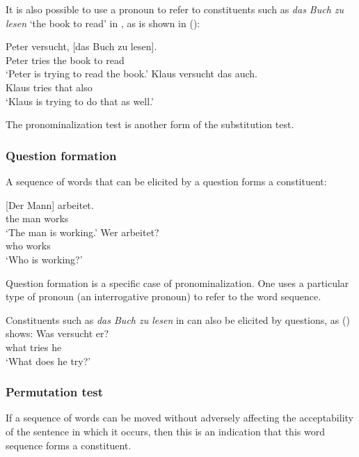 {\noindent
It is also possible to use a pronoun to refer to constituents such as \emph{das Buch zu lesen} `the
book to read' in , as is shown in ():

\eal
\ex 
\gll Peter versucht, [das Buch zu lesen].\\
	 Peter tries \spacebr{}the book to read\\
\glt `Peter is trying to read the book.'
\ex 
\gll Klaus versucht das auch.\\
	 Klaus tries that also\\
\glt `Klaus is trying to do that as well.'
\zl

\noindent
The pronominalization test is another form of the substitution test.

\subsubsection{Question formation}

A sequence of words that can be elicited by a question forms a constituent:

\eal
\ex 
\gll {}[Der Mann] arbeitet.\\
	 \spacebr{}the man works\\
\glt `The man is working.'
\ex 
\gll Wer arbeitet?\\
	 who works\\
\glt `Who is working?'
\zl

\noindent
Question formation is a specific case of pronominalization. One uses a particular type of pronoun (an interrogative 
pronoun) to refer to the word sequence.

Constituents such as \emph{das Buch zu lesen} in  can also be elicited by questions, as () 
shows:
\ea
\gll Was versucht er?\\
     what tries he\\
\glt `What does he try?'
\z



\subsubsection{Permutation test}

If a sequence of words can be moved without adversely affecting the acceptability of the sentence
in which it occurs, then this is an indication that this word sequence forms a constituent.

}
